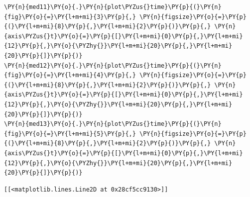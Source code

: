     \begin{tcolorbox}[breakable, size=fbox, boxrule=1pt, pad at break*=1mm,colback=cellbackground, colframe=cellborder]
\begin{Verbatim}[commandchars=\\\{\}]
\PY{n}{med11}\PY{o}{.}\PY{n}{plot\PYZus{}time}\PY{p}{(}\PY{n}{fig}\PY{o}{=}\PY{l+m+mi}{3}\PY{p}{,} \PY{n}{figsize}\PY{o}{=}\PY{p}{(}\PY{l+m+mi}{8}\PY{p}{,}\PY{l+m+mi}{2}\PY{p}{)}\PY{p}{,} \PY{n}{axis\PYZus{}t}\PY{o}{=}\PY{p}{[}\PY{l+m+mi}{0}\PY{p}{,}\PY{l+m+mi}{12}\PY{p}{,}\PY{o}{\PYZhy{}}\PY{l+m+mi}{20}\PY{p}{,}\PY{l+m+mi}{20}\PY{p}{]}\PY{p}{)}
\PY{n}{med12}\PY{o}{.}\PY{n}{plot\PYZus{}time}\PY{p}{(}\PY{n}{fig}\PY{o}{=}\PY{l+m+mi}{4}\PY{p}{,} \PY{n}{figsize}\PY{o}{=}\PY{p}{(}\PY{l+m+mi}{8}\PY{p}{,}\PY{l+m+mi}{2}\PY{p}{)}\PY{p}{,} \PY{n}{axis\PYZus{}t}\PY{o}{=}\PY{p}{[}\PY{l+m+mi}{0}\PY{p}{,}\PY{l+m+mi}{12}\PY{p}{,}\PY{o}{\PYZhy{}}\PY{l+m+mi}{20}\PY{p}{,}\PY{l+m+mi}{20}\PY{p}{]}\PY{p}{)}
\PY{n}{med13}\PY{o}{.}\PY{n}{plot\PYZus{}time}\PY{p}{(}\PY{n}{fig}\PY{o}{=}\PY{l+m+mi}{5}\PY{p}{,} \PY{n}{figsize}\PY{o}{=}\PY{p}{(}\PY{l+m+mi}{8}\PY{p}{,}\PY{l+m+mi}{2}\PY{p}{)}\PY{p}{,} \PY{n}{axis\PYZus{}t}\PY{o}{=}\PY{p}{[}\PY{l+m+mi}{0}\PY{p}{,}\PY{l+m+mi}{12}\PY{p}{,}\PY{o}{\PYZhy{}}\PY{l+m+mi}{20}\PY{p}{,}\PY{l+m+mi}{20}\PY{p}{]}\PY{p}{)}
\end{Verbatim}
\end{tcolorbox}

            \begin{tcolorbox}[breakable, size=fbox, boxrule=.5pt, pad at break*=1mm, opacityfill=0]
\begin{Verbatim}[commandchars=\\\{\}]
[[<matplotlib.lines.Line2D at 0x28cf5cc9130>]]
\end{Verbatim}
\end{tcolorbox}
        
    \begin{center}
    \end{center}
    { \hspace*{\fill} \\}
    
    \begin{center}
    \end{center}
    { \hspace*{\fill} \\}
    

